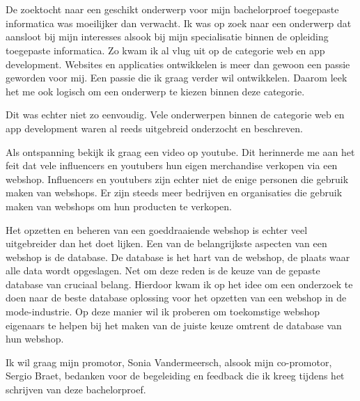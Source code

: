 
\chapter*{}%
\label{ch:voorwoord}


De zoektocht naar een geschikt onderwerp voor mijn bachelorproef toegepaste informatica was moeilijker dan verwacht.
Ik was op zoek naar een onderwerp dat aansloot bij mijn interesses alsook bij mijn specialisatie binnen de opleiding toegepaste informatica.
Zo kwam ik al vlug uit op de categorie web en app development.
Websites en applicaties ontwikkelen is meer dan gewoon een passie geworden voor mij. Een passie die ik graag verder wil ontwikkelen.
Daarom leek het me ook logisch om een onderwerp te kiezen binnen deze categorie.

Dit was echter niet zo eenvoudig.
Vele onderwerpen binnen de categorie web en app development waren al reeds uitgebreid onderzocht en beschreven.

Als ontspanning bekijk ik graag een video op youtube.
Dit herinnerde me aan het feit dat vele influencers en youtubers hun eigen merchandise verkopen via een webshop.
Influencers en youtubers zijn echter niet de enige personen die gebruik maken van webshops.
Er zijn steeds meer bedrijven en organisaties die gebruik maken van webshops om hun producten te verkopen.

Het opzetten en beheren van een goeddraaiende webshop is echter veel uitgebreider dan het doet lijken.
Een van de belangrijkste aspecten van een webshop is de database.
De database is het hart van de webshop, de plaats waar alle data wordt opgeslagen.
Net om deze reden is de keuze van de gepaste database van cruciaal belang.
Hierdoor kwam ik op het idee om een onderzoek te doen naar de beste database oplossing voor het opzetten van een webshop in de mode-industrie.
Op deze manier wil ik proberen om toekomstige webshop eigenaars te helpen bij het maken van de juiste keuze omtrent de database van hun webshop.

Ik wil graag mijn promotor, Sonia Vandermeersch, alsook mijn co-promotor, Sergio Braet, bedanken voor de begeleiding en feedback die ik kreeg tijdens het schrijven van deze bachelorproef.